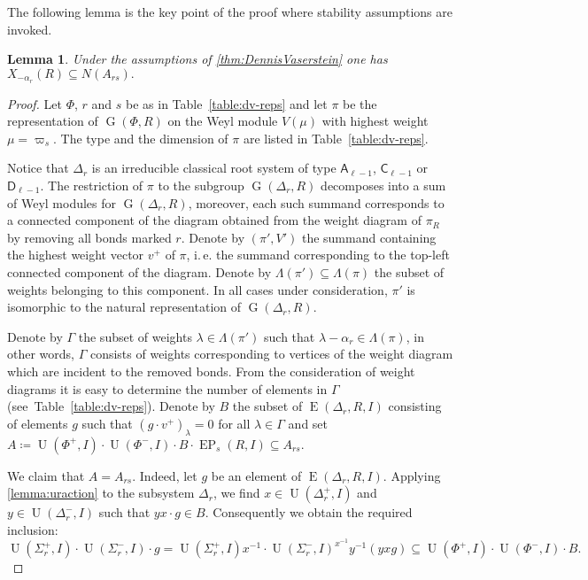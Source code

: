 \documentclass[11pt]{amsart}
\theoremstyle{plain}
\numberwithin{equation}{section}
\newtheorem{lemma}{Lemma}
\numberwithin{lemma}{section}
\theoremstyle{definition}
\theoremstyle{remark}
\DeclareMathOperator{\G}{G}
\DeclareMathOperator{\E}{E}
\DeclareMathOperator{\EP}{EP}
\DeclareMathOperator{\U}{U}
\newcommand{\rA}{\mathsf{A}}
\newcommand{\rC}{\mathsf{C}}
\newcommand{\rD}{\mathsf{D}}
\begin{document}
The following lemma is the key point of the proof where stability assumptions are invoked.
\begin{lemma}\label{lemma:Stein_reduction}
Under the assumptions of \cref{thm:DennisVaserstein} one has $X_{-\alpha_r}(R) \subseteq N(A_{rs}).$
\end{lemma}
\begin{proof}
Let $\Phi$, $r$ and $s$ be as in Table~\ref{table:dv-reps} and let $\pi$ be the representation of $\G(\Phi, R)$ on the Weyl module $V(\mu)$ with highest weight $\mu=\varpi_s$.
The type and the dimension of $\pi$ are listed in Table~\ref{table:dv-reps}. %

Notice that $\Delta_r$ is an irreducible classical root system of type $\rA_{\ell-1}$, $\rC_{\ell-1}$ or $\rD_{\ell-1}$.
The restriction of $\pi$ to the subgroup $\G(\Delta_r, R)$ decomposes into a sum of Weyl modules for $\G(\Delta_r, R)$,
 moreover, each such summand corresponds to a connected component of the diagram obtained from the weight diagram of $\pi_R$ by removing all bonds marked $r$. 
Denote by $(\pi', V')$ the summand containing the highest weight vector $v^+$ of $\pi$,
 i.\,e. the summand corresponding to the top-left connected component of the diagram. Denote by $\Lambda(\pi') \subseteq \Lambda(\pi)$ the subset of weights belonging to this component.
In all cases under consideration, $\pi'$ is isomorphic to the natural representation of $\G(\Delta_r, R)$.

Denote by $\Gamma$ the subset of weights $\lambda \in \Lambda(\pi')$ such that $\lambda - \alpha_r \in \Lambda(\pi)$,
 in other words, $\Gamma$ consists of weights corresponding to vertices of the weight diagram which are incident to the removed bonds.
From the consideration of weight diagrams it is easy to determine the number of elements in $\Gamma$ (see~Table~\ref{table:dv-reps}).
Denote by $B$ the subset of $\E(\Delta_r, R, I)$ consisting of elements $g$ such that $(g \cdot v^+)_\lambda = 0$ for all $\lambda\in\Gamma$ and
set $A\coloneqq\U(\Phi^+, I)\cdot \U(\Phi^-, I) \cdot B \cdot \EP_s(R, I) \subseteq A_{rs}.$

We claim that $A = A_{rs}$. Indeed, let $g$ be an element of $\E(\Delta_r, R, I)$. 
Applying \cref{lemma:uraction} to the subsystem $\Delta_r$, we find $x\in\U(\Delta_r^+, I)$ and $y\in \U(\Delta_r^-, I)$ such that $yx\cdot g \in B$.
Consequently we obtain the required inclusion:
\begin{equation*} \U(\Sigma^+_r, I) \cdot \U(\Sigma^-_r, I) \cdot g = \U(\Sigma^+_r, I) x^{-1} \cdot \U(\Sigma^-_r, I)^{x^{-1}} y^{-1} (yxg) \subseteq \U(\Phi^+, I) \cdot \U(\Phi^-, I) \cdot B. \end{equation*}


\end{proof}
\end{document}
